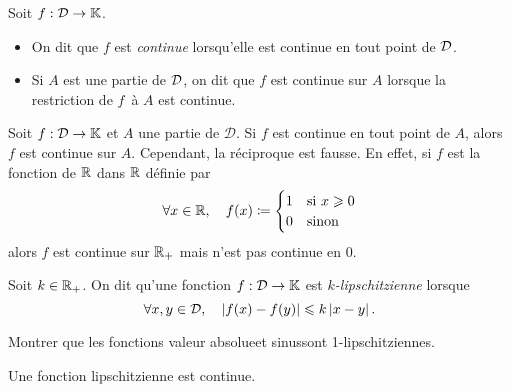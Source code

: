 \documentclass{magnolia}
\begin{document}
\begin{definition}[utile=-3]
Soit $f:\mathcal{D}\to\mathbb{K}$.
\begin{itemize}
\item On dit que $f$ est \emph{continue} lorsqu'elle est continue en tout point de
  $\mathcal{D}$.
\item Si $A$ est une partie de $\mathcal{D}$, on dit que $f$ est continue sur $A$ lorsque la
 restriction de $f$ à $A$ est continue.
\end{itemize}
\end{definition}

\begin{remarqueUnique}
\remarque Soit $f:\mathcal{D}\to\mathbb{K}$ et $A$ une partie de $\mathcal{D}$.
  Si $f$ est continue en tout point de $A$, alors $f$ est continue sur $A$. Cependant,
  la réciproque est fausse. En effet, si $f$ est la fonction de $\mathbb{R}$ dans $\mathbb{R}$ définie
  par
  \[\forall x\in\mathbb{R},\quad f(x)\coloneqq\begin{cases}
    1 & \text{si $x\geqslant 0$}\\
    0 & \text{sinon}
  \end{cases}\]
  alors $f$ est continue sur $\mathbb{R}_+$ mais n'est pas continue en 0.
\end{remarqueUnique}

\begin{definition}[utile=-3]
Soit $k\in\mathbb{R}_+$. On dit qu'une fonction $f:\mathcal{D}\to\mathbb{K}$ est \emph{$k$-lipschitzienne} lorsque
\[\forall x,y\in \mathcal{D} ,\quad \left|f(x)-f(y)\right|\leqslant k\left|x-y\right|.\] 
\end{definition}

\begin{exoUnique}
\exo Montrer que les fonctions \og valeur absolue\fg et \og sinus\fg sont
  1-lipschitziennes.
\end{exoUnique}


\begin{proposition}
Une fonction lipschitzienne est continue.
\end{proposition}
\end{document}
